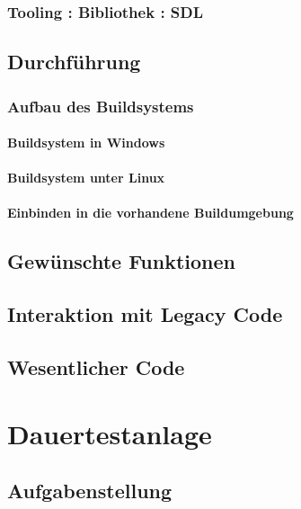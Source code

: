 \subsubsection{Tooling : Bibliothek : SDL}
\subsection{Durchführung}
\subsubsection{Aufbau des Buildsystems}
\paragraph*{Buildsystem in Windows}
\paragraph*{Buildsystem unter Linux}
\paragraph*{Einbinden in die vorhandene Buildumgebung}
\subsection{Gewünschte Funktionen}
\subsection{Interaktion mit Legacy Code}
\subsection{Wesentlicher Code}

\section{Dauertestanlage}
\subsection{Aufgabenstellung}
